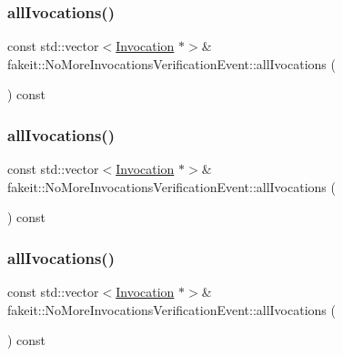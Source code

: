 \subsubsection{\texorpdfstring{allIvocations()}{allIvocations()}\hspace{0.1cm}{\footnotesize\ttfamily [5/9]}}
{\footnotesize\ttfamily const std\+::vector$<$\mbox{\hyperlink{structfakeit_1_1Invocation}{Invocation}} $\ast$$>$\& fakeit\+::\+No\+More\+Invocations\+Verification\+Event\+::all\+Ivocations (\begin{DoxyParamCaption}{ }\end{DoxyParamCaption}) const\hspace{0.3cm}{\ttfamily [inline]}}

\mbox{\label{structfakeit_1_1NoMoreInvocationsVerificationEvent_aa69cf6dc4a816429653a5885f38d07b5}} 
\subsubsection{\texorpdfstring{allIvocations()}{allIvocations()}\hspace{0.1cm}{\footnotesize\ttfamily [6/9]}}
{\footnotesize\ttfamily const std\+::vector$<$\mbox{\hyperlink{structfakeit_1_1Invocation}{Invocation}} $\ast$$>$\& fakeit\+::\+No\+More\+Invocations\+Verification\+Event\+::all\+Ivocations (\begin{DoxyParamCaption}{ }\end{DoxyParamCaption}) const\hspace{0.3cm}{\ttfamily [inline]}}

\mbox{\label{structfakeit_1_1NoMoreInvocationsVerificationEvent_aa69cf6dc4a816429653a5885f38d07b5}} 
\subsubsection{\texorpdfstring{allIvocations()}{allIvocations()}\hspace{0.1cm}{\footnotesize\ttfamily [7/9]}}
{\footnotesize\ttfamily const std\+::vector$<$\mbox{\hyperlink{structfakeit_1_1Invocation}{Invocation}} $\ast$$>$\& fakeit\+::\+No\+More\+Invocations\+Verification\+Event\+::all\+Ivocations (\begin{DoxyParamCaption}{ }\end{DoxyParamCaption}) const\hspace{0.3cm}{\ttfamily [inline]}}

